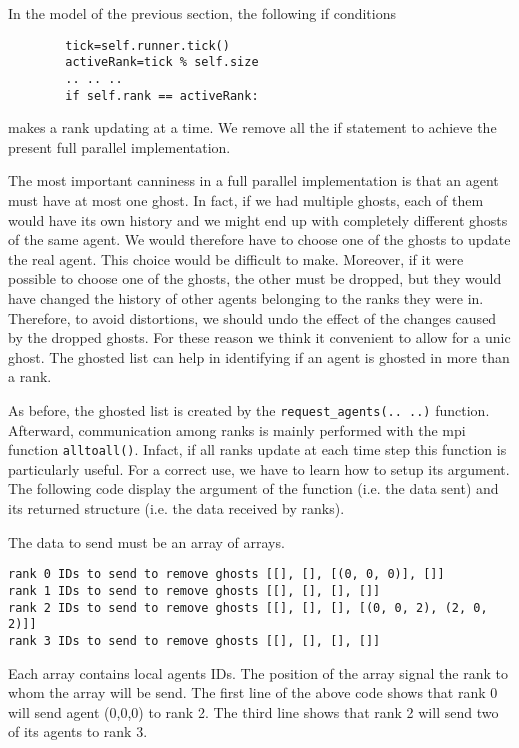 \documentclass{article}
\begin{document}
In the model of the previous section, the following if conditions
\begin{verbatim}
        tick=self.runner.tick()
        activeRank=tick % self.size
        .. .. ..
        if self.rank == activeRank:
\end{verbatim}
makes a rank updating at a time. We remove all the if statement to achieve the present full parallel implementation.

The most important canniness in a full parallel implementation is that an agent must have at most one ghost. 
In fact, if we had multiple ghosts, each of them would have its own history and we might end up with completely different ghosts of the same agent. We would therefore have to choose one of the ghosts to update the real agent. This choice would be difficult to make. Moreover, if it were possible to choose one of the ghosts, the other must be dropped, but they would have changed the history of other agents belonging to the ranks they were in. Therefore, to avoid distortions, we should undo the effect of the changes caused by the dropped ghosts. For these reason we think it convenient to allow for a unic ghost.
The ghosted list can help in identifying if an agent is ghosted in more than a rank. 

As before, the ghosted list is created by the \verb+request_agents(.. ..)+ function.
Afterward, communication among ranks is mainly performed with the mpi function \verb+alltoall()+. Infact, if all ranks update at each time step this function is particularly useful. For a correct use, we have to learn how to setup its argument. The following code display the argument of the function (i.e. the data sent) and its returned structure (i.e. the data received by ranks).

The data to send must be an array of arrays. 
\begin{verbatim}
rank 0 IDs to send to remove ghosts [[], [], [(0, 0, 0)], []]
rank 1 IDs to send to remove ghosts [[], [], [], []]
rank 2 IDs to send to remove ghosts [[], [], [], [(0, 0, 2), (2, 0, 2)]]
rank 3 IDs to send to remove ghosts [[], [], [], []]
\end{verbatim}
Each array contains local agents IDs. The position of the array signal the rank to whom the array will be send.
The first line of the above code shows that rank 0 will send agent (0,0,0) to rank 2. The third line shows that rank 2 will send two of its agents to rank 3.
\end{document}
